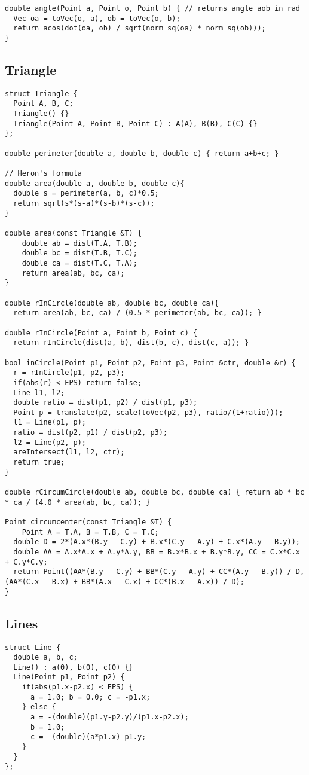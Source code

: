 \documentclass[8pt, oneside]{extarticle}
\begin{document}
\begin{multicols}{3}
\begin{lstlisting}
double angle(Point a, Point o, Point b) { // returns angle aob in rad
  Vec oa = toVec(o, a), ob = toVec(o, b);
  return acos(dot(oa, ob) / sqrt(norm_sq(oa) * norm_sq(ob)));
}
\end{lstlisting}

\subsection{Triangle}
\begin{lstlisting}
struct Triangle {
  Point A, B, C;
  Triangle() {}
  Triangle(Point A, Point B, Point C) : A(A), B(B), C(C) {}
};

double perimeter(double a, double b, double c) { return a+b+c; }

// Heron's formula
double area(double a, double b, double c){
  double s = perimeter(a, b, c)*0.5;
  return sqrt(s*(s-a)*(s-b)*(s-c));
}

double area(const Triangle &T) {
    double ab = dist(T.A, T.B);
    double bc = dist(T.B, T.C);
    double ca = dist(T.C, T.A);
    return area(ab, bc, ca);
}

double rInCircle(double ab, double bc, double ca){
  return area(ab, bc, ca) / (0.5 * perimeter(ab, bc, ca)); }

double rInCircle(Point a, Point b, Point c) {
  return rInCircle(dist(a, b), dist(b, c), dist(c, a)); }

bool inCircle(Point p1, Point p2, Point p3, Point &ctr, double &r) {
  r = rInCircle(p1, p2, p3);
  if(abs(r) < EPS) return false;
  Line l1, l2;
  double ratio = dist(p1, p2) / dist(p1, p3);
  Point p = translate(p2, scale(toVec(p2, p3), ratio/(1+ratio)));
  l1 = Line(p1, p);
  ratio = dist(p2, p1) / dist(p2, p3);
  l2 = Line(p2, p);
  areIntersect(l1, l2, ctr);
  return true;
}

double rCircumCircle(double ab, double bc, double ca) { return ab * bc * ca / (4.0 * area(ab, bc, ca)); }

Point circumcenter(const Triangle &T) {
    Point A = T.A, B = T.B, C = T.C;
  double D = 2*(A.x*(B.y - C.y) + B.x*(C.y - A.y) + C.x*(A.y - B.y));
  double AA = A.x*A.x + A.y*A.y, BB = B.x*B.x + B.y*B.y, CC = C.x*C.x + C.y*C.y;
  return Point((AA*(B.y - C.y) + BB*(C.y - A.y) + CC*(A.y - B.y)) / D, (AA*(C.x - B.x) + BB*(A.x - C.x) + CC*(B.x - A.x)) / D);
}
\end{lstlisting}

\subsection{Lines}
\begin{lstlisting}
struct Line {
  double a, b, c;
  Line() : a(0), b(0), c(0) {}
  Line(Point p1, Point p2) {
    if(abs(p1.x-p2.x) < EPS) {
      a = 1.0; b = 0.0; c = -p1.x;
    } else {
      a = -(double)(p1.y-p2.y)/(p1.x-p2.x);
      b = 1.0;
      c = -(double)(a*p1.x)-p1.y;
    }
  }
};


\end{lstlisting}
\end{multicols}
\end{document}
